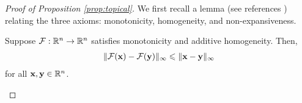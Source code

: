 \documentclass[letterpaper, 10 pt, conference]{ieeeconf}
\begin{document}
\begin{proof}[Proof of Proposition \ref{prop:topical}]
    We first recall a lemma (see references \cite{crandall1980,gunawardena1995}) relating the three axioms: monotonicity, homogeneity, and non-expansiveness.
    \begin{lemma}
        Suppose $\mathcal{F}: \mathbb{R}^n \to \mathbb{R}^n$ satisfies monotonicity and additive homogeneity. Then,
        \begin{align*}
            \| \mathcal{F}(\mathbf{x}) - \mathcal{F}(\mathbf{y}) \|_{\infty} \leqslant \| \mathbf{x} - \mathbf{y}\|_{\infty}
        \end{align*}
        for all $\mathbf{x}, \mathbf{y} \in \mathbb{R}^n$.
    \end{lemma}

\end{proof}
\end{document}

